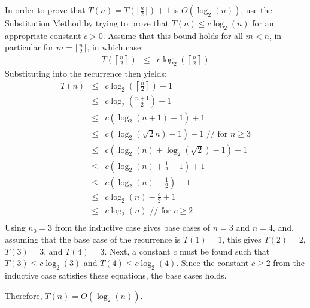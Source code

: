 In order to prove that $T(n) = T(\lceil \frac{n}{2} \rceil) + 1$ is $O(\log_2(n))$, use the Substitution Method by trying to prove that $T(n) \leq c \log_2(n)$ for an appropriate constant $c > 0$.
Assume that this bound holds for all $m < n$, in particular for $m = \lceil \frac{n}{2} \rceil$, in which case:
\begin{eqnarray*}
	T\left(\left\lceil \frac{n}{2} \right\rceil\right) &\leq& c \log_2\left(\left\lceil \frac{n}{2} \right\rceil\right)
\end{eqnarray*}
Substituting into the recurrence then yields:
\begin{eqnarray*}
	T(n) &\leq& c\log_2\left(\left\lceil \frac{n}{2} \right\rceil\right) + 1 \\
	 &\leq& c\log_2\left(\frac{n + 1}{2}\right) + 1 \\
	 &\leq& c(\log_2(n + 1) - 1) + 1 \\
	 &\leq& c\left(\log_2\left(\sqrt{2}n\right) - 1\right) + 1 \text{  // for $n \geq 3$} \\
	 &\leq& c\left(\log_2\left(n\right) + \log_2\left(\sqrt{2}\right) - 1\right) + 1 \\
	 &\leq& c\left(\log_2\left(n\right) + \frac{1}{2} - 1\right) + 1 \\
	 &\leq& c\left(\log_2\left(n\right) - \frac{1}{2}\right) + 1 \\
	 &\leq& c\log_2(n) - \frac{c}{2} + 1 \\
	 &\leq& c\log_2(n) \text{  // for $c \geq 2$} \\
\end{eqnarray*}
Using $n_0 = 3$ from the inductive case gives base cases of $n = 3$ and $n = 4$, and, assuming that the base case of the recurrence is $T(1) = 1$, this gives $T(2) = 2$, $T(3) = 3$, and $T(4) = 3$.
Next, a constant $c$ must be found such that $T(3) \leq c \log_2(3)$ and $T(4) \leq c \log_2(4)$.
Since the constant $c \geq 2$ from the inductive case satisfies these equations, the base cases holds.

Therefore, $T(n) = O(\log_2(n))$.
